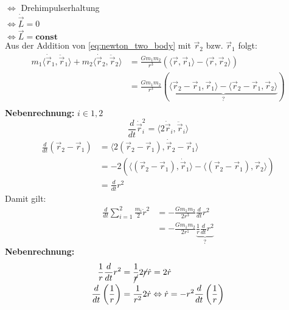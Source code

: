 \begin{description}
        $\Leftrightarrow$ Drehimpulserhaltung\\
        $\Leftrightarrow \dot{\vec{L}} = 0$\\
        $\Leftrightarrow \dot{\vec{L}} = \textbf{const}$\\
        Aus der Addition von \autoref{eq:newton_two_body} mit $\vec{r}_2$ bzw. $\vec{r}_1$ folgt:
        \begin{align*}
            m_1 \langle\dot{\vec{r}}_1, \ddot{\vec{r}}_1\rangle + m_2 \langle\dot{\vec{r}}_2, \ddot{\vec{r}}_2\rangle 
                &= \frac{Gm_1m_2}{r^3} \left(\langle\vec{r}, \vec{r}_1\rangle - \langle\vec{r}, \vec{r}_2\rangle\right)\\
                &= \frac{Gm_1m_2}{r^3} (\underbrace{\langle\vec{r}_2 - \vec{r}_1, \vec{r}_1\rangle - \langle\vec{r}_2 - \vec{r}_1, \vec{r}_2\rangle}_{?})\\
        \end{align*}
        \color{OliveGreen}
        \textbf{Nebenrechnung:} $i \in {1,2}$
        \[\frac{d}{dt}\dot{\vec{r}}_i^2 = \langle2\dot{\vec{r}}_i, \ddot{\vec{r}}_i\rangle \tag{Kettenregel}\]
        \color{black}
        \begin{align*}
            \frac{d}{dt}(\vec{r}_2 - \vec{r}_1) &= \langle2(\vec{r}_2 - \vec{r}_1), \dot{\vec{r}}_2 - \vec{r}_1\rangle\\ 
                                                &= -2 \left(\langle(\vec{r}_2 - \vec{r}_1), \dot{\vec{r}}_1\rangle - \langle(\vec{r}_2 - \vec{r}_1), \vec{r}_2\rangle\right)\\
                                                &= \frac{d}{dt} r^2
        \end{align*}
        Damit gilt:
        \begin{align*}
            \frac{d}{dt} \sum\limits_{i = 1}^{2} \frac{m_i}{2} \dot r^2 &= -\frac{Gm_1m_2}{2r^3} \frac{d}{dt} r^2\\
                                                                        &= -\frac{Gm_1m_2}{2r^1} \underbrace{\frac{1}{r} \frac{d}{dt} r^2}_{?} \tag{skalare Gleichung}
        \end{align*}
        \color{OliveGreen}
        \textbf{Nebenrechnung:}
        \begin{align}
            \frac{1}{r} \frac{d}{dt} r^2            &= \frac{1}{\cancel{r}} 2 \cancel{r} \dot{r} = 2 \dot{r} \label{eq:newton_nr_1}\\
            \frac{d}{dt} \left(\frac{1}{r}\right)   &= \frac{1}{r^2} 2 \dot{r} \Leftrightarrow \dot{r} = -r^2 \frac{d}{dt} \left(\frac{1}{r}\right) \label{eq:newton_nr_2}\\

\end{align}
\end{description}
